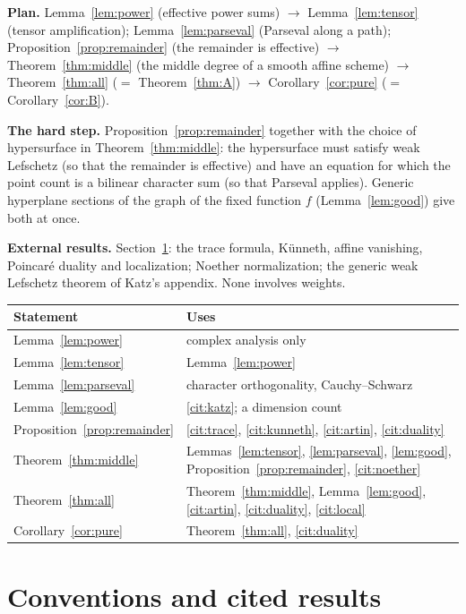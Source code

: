 \documentclass[11pt,a4paper]{article}
\theoremstyle{plain}
\theoremstyle{definition}
\theoremstyle{remark}
\begin{document}
\textbf{Plan.} Lemma~\ref{lem:power} (effective power sums) $\to$ Lemma~\ref{lem:tensor} (tensor amplification);
Lemma~\ref{lem:parseval} (Parseval along a path); Proposition~\ref{prop:remainder} (the remainder is effective)
$\to$ Theorem~\ref{thm:middle} (the middle degree of a smooth affine scheme) $\to$ Theorem~\ref{thm:all}
($=$ Theorem~\ref{thm:A}) $\to$ Corollary~\ref{cor:pure} ($=$ Corollary~\ref{cor:B}).

\textbf{The hard step.} Proposition~\ref{prop:remainder} together with the choice of hypersurface in
Theorem~\ref{thm:middle}: the hypersurface must satisfy weak Lefschetz (so that the remainder is effective) and have an
equation for which the point count is a bilinear character sum (so that Parseval applies). Generic hyperplane sections
of the graph of the fixed function $f$ (Lemma~\ref{lem:good}) give both at once.

\textbf{External results.} Section~\ref{sec:inputs}: the trace formula, K\"unneth, affine vanishing, Poincar\'e duality
and localization; Noether normalization; the generic weak Lefschetz theorem of Katz's appendix. None involves weights.

\medskip
\noindent
\begin{tabularx}{\textwidth}{@{}L{3.6cm}Y@{}}
\toprule
Statement & Uses\\
\midrule
Lemma~\ref{lem:power} & complex analysis only\\
Lemma~\ref{lem:tensor} & Lemma~\ref{lem:power}\\
Lemma~\ref{lem:parseval} & character orthogonality, Cauchy--Schwarz\\
Lemma~\ref{lem:good} & \ref{cit:katz}; a dimension count\\
Proposition~\ref{prop:remainder} & \ref{cit:trace}, \ref{cit:kunneth}, \ref{cit:artin}, \ref{cit:duality}\\
Theorem~\ref{thm:middle} & Lemmas~\ref{lem:tensor}, \ref{lem:parseval}, \ref{lem:good}, Proposition~\ref{prop:remainder},
\ref{cit:noether}\\
Theorem~\ref{thm:all} & Theorem~\ref{thm:middle}, Lemma~\ref{lem:good}, \ref{cit:artin}, \ref{cit:duality},
\ref{cit:local}\\
Corollary~\ref{cor:pure} & Theorem~\ref{thm:all}, \ref{cit:duality}\\
\bottomrule
\end{tabularx}

\section{Conventions and cited results}\label{sec:inputs}
\end{document}
